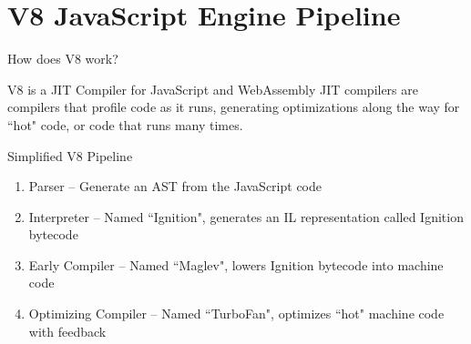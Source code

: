 \section{V8 JavaScript Engine Pipeline}
\frame{\sectionpage}

\begin{frame}{How does V8 work?}
    \begin{block}{V8 is a JIT Compiler for JavaScript and WebAssembly}
    JIT compilers are compilers that profile code as it runs, generating optimizations along the way for ``hot" code, or code that runs many times. 
    \end{block}
    \begin{block}{Simplified V8 Pipeline}
        \begin{enumerate}
            \item Parser -- Generate an AST from the JavaScript code
            \item Interpreter -- Named ``Ignition", generates an IL representation called Ignition bytecode
            \item Early Compiler -- Named ``Maglev", lowers Ignition bytecode into machine code
            \item Optimizing Compiler -- Named ``TurboFan", optimizes ``hot" machine code with feedback
        \end{enumerate}
    \end{block}
\end{frame} 

